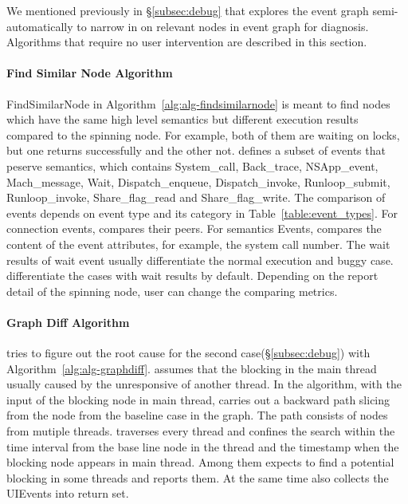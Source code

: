We mentioned previously in \S\ref{subsec:debug} that \xxx explores the event
graph semi-automatically to narrow in on relevant nodes in event graph for
diagnosis. Algorithms that require no user intervention are described
in this section.

\paragraph{Find Similar Node Algorithm}

FindSimilarNode in Algorithm~\ref{alg:alg-findsimilarnode} is meant to find
nodes which have the same high level semantics but different execution results
compared to the spinning node. For example, both of them are waiting on locks,
but one returns successfully and the other not. \xxx defines a subset of events
that peserve semantics, which contains System\_call, Back\_trace, NSApp\_event,
Mach\_message, Wait, Dispatch\_enqueue, Dispatch\_invoke, Runloop\_submit,
Runloop\_invoke, Share\_flag\_read and Share\_flag\_write. The comparison of
events depends on event type and its category in Table~\ref{table:event_types}.
For connection events, \xxx compares their peers. For semantics Events, \xxx
compares the content of the event attributes, for example, the system call
number. The wait results of wait event usually differentiate the normal
execution and buggy case. \xxx differentiate the cases with wait results by
default. Depending on the report detail of the spinning node, user can change
the comparing metrics.

\paragraph{Graph Diff Algorithm}

\xxx tries to figure out the root cause for the second
case(\S\ref{subsec:debug}) with Algorithm~\ref{alg:alg-graphdiff}. \xxx assumes
that the blocking in the main thread usually caused by the unresponsive of
another thread. In the algorithm, with the input of the blocking node in main
thread, \xxx carries out a backward path slicing from the node from the baseline
case in the graph. The path consists of nodes from mutiple threads. \xxx
traverses every thread and confines the search within the time interval from the
base line node in the thread and the timestamp when the blocking node appears
in main thread. Among them \xxx expects to find a potential blocking in some
threads and reports them. At the same time \xxx also collects the UIEvents into
return set.

